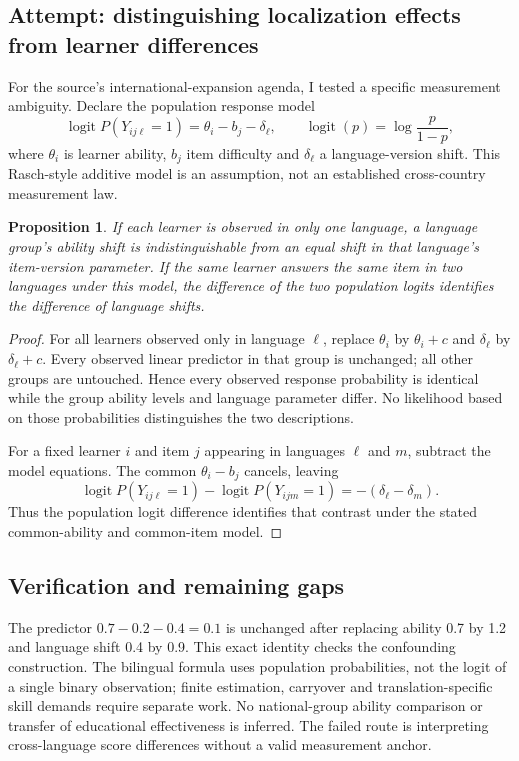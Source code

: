 \documentclass[11pt]{article}
\newtheorem{proposition}{Proposition}
\begin{document}
\subsection{Attempt: distinguishing localization effects from learner differences}
For the source's international-expansion agenda, I tested a specific measurement ambiguity. Declare the population response model
\[
\operatorname{logit}P(Y_{ij\ell}=1)=\theta_i-b_j-\delta_\ell,
\qquad \operatorname{logit}(p)=\log\frac p{1-p},
\]
where $\theta_i$ is learner ability, $b_j$ item difficulty and $\delta_\ell$ a language-version shift. This Rasch-style additive model is an assumption, not an established cross-country measurement law.
\begin{proposition}
If each learner is observed in only one language, a language group's ability shift is indistinguishable from an equal shift in that language's item-version parameter. If the same learner answers the same item in two languages under this model, the difference of the two population logits identifies the difference of language shifts.
\end{proposition}
\begin{proof}
For all learners observed only in language $\ell$, replace $\theta_i$ by $\theta_i+c$ and $\delta_\ell$ by $\delta_\ell+c$. Every observed linear predictor in that group is unchanged; all other groups are untouched. Hence every observed response probability is identical while the group ability levels and language parameter differ. No likelihood based on those probabilities distinguishes the two descriptions.

For a fixed learner $i$ and item $j$ appearing in languages $\ell$ and $m$, subtract the model equations. The common $\theta_i-b_j$ cancels, leaving
\[
\operatorname{logit}P(Y_{ij\ell}=1)-\operatorname{logit}P(Y_{ijm}=1)
=-(\delta_\ell-\delta_m).
\]
Thus the population logit difference identifies that contrast under the stated common-ability and common-item model.
\end{proof}
\subsection{Verification and remaining gaps}
The predictor $0.7-0.2-0.4=0.1$ is unchanged after replacing ability 0.7 by 1.2 and language shift 0.4 by 0.9. This exact identity checks the confounding construction. The bilingual formula uses population probabilities, not the logit of a single binary observation; finite estimation, carryover and translation-specific skill demands require separate work. No national-group ability comparison or transfer of educational effectiveness is inferred. The failed route is interpreting cross-language score differences without a valid measurement anchor.
\end{document}

